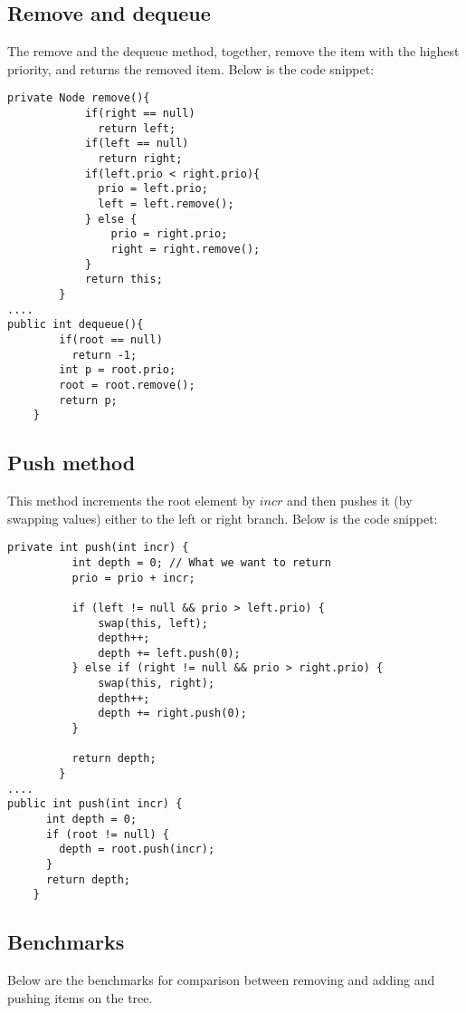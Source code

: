 \documentclass[a4paper,11pt]{article}
\begin{document}
\subsection*{Remove and dequeue}
The remove and the dequeue method, together, remove the item with the highest priority, and returns the removed item. Below is the code snippet:

\begin{verbatim}
private Node remove(){
            if(right == null)
              return left;
            if(left == null)
              return right;
            if(left.prio < right.prio){
              prio = left.prio;
              left = left.remove();
            } else {
                prio = right.prio;
                right = right.remove();
            } 
            return this;
        }
....
public int dequeue(){
        if(root == null)
          return -1;
        int p = root.prio;
        root = root.remove();
        return p;
    }
\end{verbatim}

\subsection*{Push method}
This method increments the root element by $incr$ and then pushes it (by swapping values) either to the left or right branch. Below is the code snippet:

\begin{verbatim}
private int push(int incr) {
          int depth = 0; // What we want to return
          prio = prio + incr;

          if (left != null && prio > left.prio) { 
              swap(this, left);
              depth++;
              depth += left.push(0);
          } else if (right != null && prio > right.prio) { 
              swap(this, right);
              depth++;
              depth += right.push(0);
          }

          return depth;
        }
....
public int push(int incr) {
      int depth = 0;
      if (root != null) {
        depth = root.push(incr);
      }
      return depth;
    }
\end{verbatim}

\subsection*{Benchmarks}
Below are the benchmarks for comparison between removing and adding and pushing items on the tree. 
\end{document}
